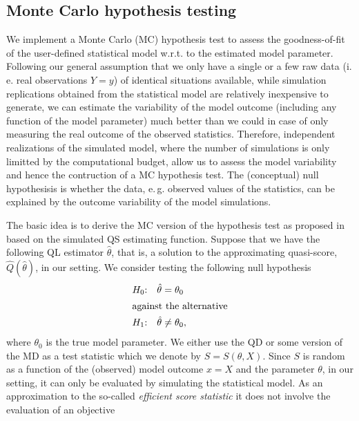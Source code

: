 \documentclass[article, nojss]{jss}
\numberwithin{equation}{section}			%
\begin{document}
\subsection{Monte Carlo hypothesis testing}\label{subsec:testing}
We implement a Monte Carlo (MC) hypothesis test \citep[see,
e.\,g.][sect.~7.1]{Ripley2009} to assess the goodness-of-fit of the user-defined
statistical model w.r.t. to the estimated model parameter. Following our general
assumption that we only have a single or a few raw data (i.\,e. real
observations $Y=y$) of identical situations available, while simulation replications
obtained from the statistical model are relatively inexpensive to generate, we
can estimate the variability of the model outcome (including any function of the model parameter)
much better than we could in case of only measuring the real outcome of the
observed statistics. Therefore, independent realizations of the simulated model, where the number
of simulations is only limitted by the computational budget, allow us to assess
the model variability and hence the contruction of a MC hypothesis test. The (conceptual) null hypothesisis
is whether the data, e.\,g. observed values of the statistics, can
be explained by the outcome variability of the model simulations.\par
%
The basic idea is to derive the MC version of the hypothesis test as proposed in
\citet{ref:Heyde1997} based on the simulated QS estimating function. Suppose
that we have the following QL estimator $\hat{\theta}$, that is, a solution to the
approximating quasi-score, $\hat{Q}(\hat{\theta})$, in our setting. We consider
testing the following null hypothesis
\begin{align*}
  H_0\text{:}\quad &\hat{\theta} = \theta_0 \\
  \intertext{against the alternative}
  H_1\text{:}\quad &\hat{\theta} \neq \theta_0,
\end{align*}
where $\theta_0$ is the true model parameter.
We either use the QD or some version of the MD as a test statistic which we denote by $S=S(\theta,X)$.
Since $S$ is random as a function of the (observed) model outcome $x=X$ and the
parameter $\theta$, in our setting, it can only be evaluated by simulating the
statistical model. As an approximation to the so-called \emph{efficient score statistic}
\citep{ref:Heyde1997} it does not involve the evaluation of an objective
\end{document}
